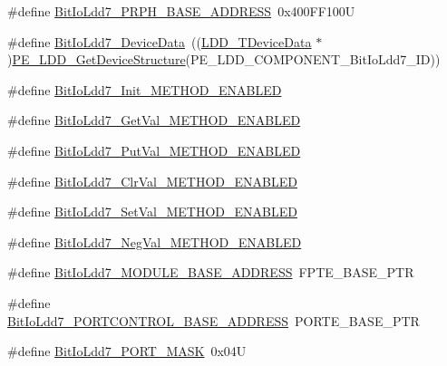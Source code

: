 \begin{DoxyCompactItemize}
\item 
\#define \hyperlink{group___bit_io_ldd7__module_gaecb0933dfdc4408d4e82af57b1458b41}{Bit\-Io\-Ldd7\-\_\-\-P\-R\-P\-H\-\_\-\-B\-A\-S\-E\-\_\-\-A\-D\-D\-R\-E\-S\-S}~0x400\-F\-F100\-U
\item 
\#define \hyperlink{group___bit_io_ldd7__module_ga28a1c938c911f765d2dc333694f9505f}{Bit\-Io\-Ldd7\-\_\-\-Device\-Data}~((\hyperlink{group___p_e___types__module_gac5cf1362f1f0e3a2ce71b1bf2276d091}{L\-D\-D\-\_\-\-T\-Device\-Data} $\ast$)\hyperlink{group___p_e___types__module_gaa1c23d559daef5bcd3327ca83fb56f5a}{P\-E\-\_\-\-L\-D\-D\-\_\-\-Get\-Device\-Structure}(P\-E\-\_\-\-L\-D\-D\-\_\-\-C\-O\-M\-P\-O\-N\-E\-N\-T\-\_\-\-Bit\-Io\-Ldd7\-\_\-\-I\-D))
\item 
\#define \hyperlink{group___bit_io_ldd7__module_ga0cd7de05139351a8d7223583734bc161}{Bit\-Io\-Ldd7\-\_\-\-Init\-\_\-\-M\-E\-T\-H\-O\-D\-\_\-\-E\-N\-A\-B\-L\-E\-D}
\item 
\#define \hyperlink{group___bit_io_ldd7__module_ga324a86d83f0091eb5a4f1c904aba205f}{Bit\-Io\-Ldd7\-\_\-\-Get\-Val\-\_\-\-M\-E\-T\-H\-O\-D\-\_\-\-E\-N\-A\-B\-L\-E\-D}
\item 
\#define \hyperlink{group___bit_io_ldd7__module_ga67378fa52fb236926852eaa6a8b436d6}{Bit\-Io\-Ldd7\-\_\-\-Put\-Val\-\_\-\-M\-E\-T\-H\-O\-D\-\_\-\-E\-N\-A\-B\-L\-E\-D}
\item 
\#define \hyperlink{group___bit_io_ldd7__module_gaea56f115a6bef18bb9f57ff9d981ccbd}{Bit\-Io\-Ldd7\-\_\-\-Clr\-Val\-\_\-\-M\-E\-T\-H\-O\-D\-\_\-\-E\-N\-A\-B\-L\-E\-D}
\item 
\#define \hyperlink{group___bit_io_ldd7__module_gacb3f57b0defc7e929b43ddd858acfb15}{Bit\-Io\-Ldd7\-\_\-\-Set\-Val\-\_\-\-M\-E\-T\-H\-O\-D\-\_\-\-E\-N\-A\-B\-L\-E\-D}
\item 
\#define \hyperlink{group___bit_io_ldd7__module_ga6e799e6a1ee1db643a4c9ef9e69b8180}{Bit\-Io\-Ldd7\-\_\-\-Neg\-Val\-\_\-\-M\-E\-T\-H\-O\-D\-\_\-\-E\-N\-A\-B\-L\-E\-D}
\item 
\#define \hyperlink{group___bit_io_ldd7__module_gad8a699f629559c876160d573a75c2914}{Bit\-Io\-Ldd7\-\_\-\-M\-O\-D\-U\-L\-E\-\_\-\-B\-A\-S\-E\-\_\-\-A\-D\-D\-R\-E\-S\-S}~F\-P\-T\-E\-\_\-\-B\-A\-S\-E\-\_\-\-P\-T\-R
\item 
\#define \hyperlink{group___bit_io_ldd7__module_gac518d50a533da6d2db8b9027e57fc04f}{Bit\-Io\-Ldd7\-\_\-\-P\-O\-R\-T\-C\-O\-N\-T\-R\-O\-L\-\_\-\-B\-A\-S\-E\-\_\-\-A\-D\-D\-R\-E\-S\-S}~P\-O\-R\-T\-E\-\_\-\-B\-A\-S\-E\-\_\-\-P\-T\-R
\item 
\#define \hyperlink{group___bit_io_ldd7__module_gab9e4e814ee4d363a367ae7b2836543fc}{Bit\-Io\-Ldd7\-\_\-\-P\-O\-R\-T\-\_\-\-M\-A\-S\-K}~0x04\-U
\end{DoxyCompactItemize}
